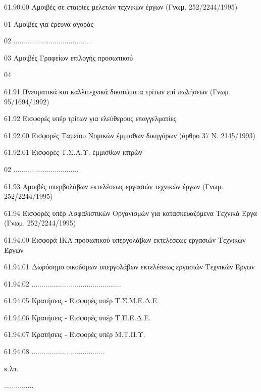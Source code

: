 \documentclass[A4,10pt,greek]{book}
\begin{document}
                     61.90.00   Αμοιβές σε εταιρίες μελετών τεχνικών έργων
                                      (Γνωμ. 252/2244/1995)

                                01   Αμοιβές για έρευνα αγοράς

                                02   ........................................

                                03   Αμοιβές Γραφείων επιλογής προσωπικού

                                04

        61.91   Πνευματικά και καλλιτεχνικά δικαιώματα τρίτων επί πωλήσεων
                    (Γνωμ. 95/1694/1992)

        61.92   Εισφορές υπέρ τρίτων για ελεύθερους επαγγελματίες

                     61.92.00   Εισφορές Ταμείου Νομικών έμμισθων δικηγόρων
                                      (άρθρο 37 Ν. 2145/1993)

                     61.92.01   Εισφορές Τ.Σ.Α.Υ. έμμισθων ιατρών

                                02   .................................

        61.93   Αμοιβές υπερβολάβων εκτελέσεως εργασιών τεχνικών έργων
                    (Γνωμ. 252/2244/1995)

        61.94   Εισφορές υπέρ Ασφαλιστικών Οργανισμών για κατασκευαζόμενα
                     Τεχνικά Έργα (Γνωμ. 252/2244/1995)

                     61.94.00   Εισφορά ΙΚΑ προσωπικού υπεργολάβων εκτελέσεως εργασιών
                                      Τεχνικών Έργων

                     61.94.01   Δωρόσημο οικοδόμων υπεργολάβων εκτελέσεως εργασιών
                                      Τεχνικών Έργων

                     61.94.02   ..............................................

                     61.94.05   Κρατήσεις - Εισφορές υπέρ Τ.Σ.Μ.Ε.Δ.Ε.

                     61.94.06   Κρατήσεις - Εισφορές υπέρ Τ.Π.Ε.Δ.Ε.

                     61.94.07   Κρατήσεις - Εισφορές υπέρ Μ.Τ.Π.Υ.

                     61.94.08   .....................................

                     κ.λπ.

                     ...............
\end{document}
